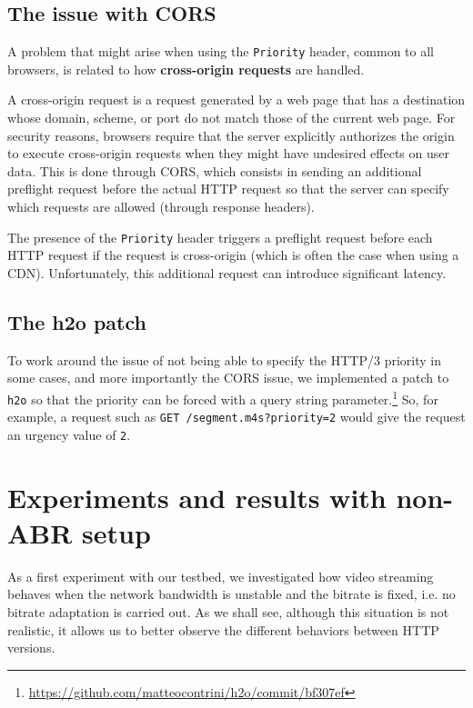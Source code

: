 \subsection{The issue with CORS}
\label{sec:eval/browsers/cors}

A problem that might arise when using the \texttt{Priority} header, common to all browsers, is related to how \textbf{cross-origin requests} are handled.

A cross-origin request is a request generated by a web page that has a destination whose domain, scheme, or port do not match those of the current web page. For security reasons, browsers require that the server explicitly authorizes the origin to execute cross-origin requests when they might have undesired effects on user data. This is done through CORS, which consists in sending an additional preflight request before the actual HTTP request so that the server can specify which requests are allowed (through response headers).

The presence of the \texttt{Priority} header triggers a preflight request before each HTTP request if the request is cross-origin (which is often the case when using a CDN). Unfortunately, this additional request can introduce significant latency.

\subsection{The h2o patch}
\label{sec:eval/browsers/patch}

To work around the issue of not being able to specify the HTTP/3 priority in some cases, and more importantly the CORS issue, we implemented a patch to \texttt{h2o} so that the priority can be forced with a query string parameter.\footnote{\url{https://github.com/matteocontrini/h2o/commit/bf307ef}} So, for example, a request such as \texttt{GET /segment.m4s?priority=2} would give the request an urgency value of \texttt{2}.

\section{Experiments and results with non-ABR setup}
\label{sec:eval/non-abr}

As a first experiment with our testbed, we investigated how video streaming behaves when the network bandwidth is unstable and the bitrate is fixed, i.e. no bitrate adaptation is carried out. As we shall see, although this situation is not realistic, it allows us to better observe the different behaviors between HTTP versions.


